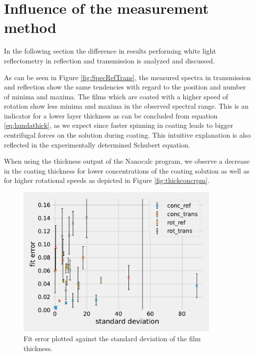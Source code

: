 \section{Influence of the measurement method}
\label{sec:VglMeth}

In the following section the difference in results performing white light reflectometry in reflection
and transmission is analyzed and discussed.

As can be seen in Figure \ref{fig:SpecRefTrans}, the measured spectra in transmission and reflection show the same tendencies with regard to the position and number of minima and maxima. The films which are coated with a higher speed of rotation show less minima and maxima in the 
observed spectral range. This is an indicator for a lower layer thickness as can be concluded from equation \ref{eq:lamdathick}, as we expect since faster spinning in coating leads to 
bigger centrifugal forces on the solution during coating. This intuitive explanation is also reflected in the experimentally determined Schubert equation. 

When using the thickness output of the Nanocalc program, we observe a decrease in the coating thickness for lower concentrations of the coating solution as well as for higher rotational speeds as depicted in Figure \ref{fig:thickconcrpm}.

%     


\begin{figure}[h]
    \centering
    \includegraphics[width = 10cm]{Programmien/FitFehlergegenstd/FitFehlergegenStd.pdf}
    \caption{Fit error plotted against the standard deviation of the film thickness.}
    \label{fig:FitFehlergegenStd}
\end{figure}


